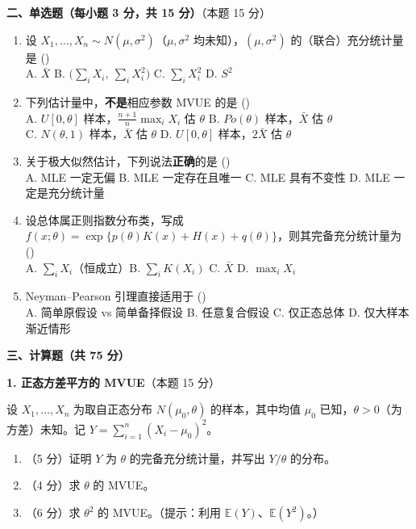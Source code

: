 \documentclass[12pt,a4paper]{ctexart}
\newcommand{\question}[2]{\bigskip\noindent\textbf{#1}\quad（本题 #2 分）\par\nobreak\medskip}
\newcommand{\E}{\mathbb{E}}
\begin{document}
\question{二、单选题（每小题 3 分，共 15 分）}{15}
\begin{enumerate}[label=\arabic*.,leftmargin=2.0em]
  \item 设 $X_1,\dots,X_n\sim N(\mu,\sigma^2)$（$\mu,\sigma^2$ 均未知），$(\mu,\sigma^2)$ 的（联合）充分统计量是 \hfill(\underline{\hspace{1.2cm}})\\
  A. $\bar X$ \quad B. $\big(\sum_i X_i,\ \sum_i X_i^2\big)$ \quad C. $\sum_i X_i^2$ \quad D. $S^2$
  \item 下列估计量中，\textbf{不是}相应参数 MVUE 的是 \hfill(\underline{\hspace{1.2cm}})\\
  A. $U[0,\theta]$ 样本，$\frac{n+1}{n}\max_i X_i$ 估 $\theta$ \quad B. $Po(\theta)$ 样本，$\bar X$ 估 $\theta$\\
  C. $N(\theta,1)$ 样本，$\bar X$ 估 $\theta$ \quad D. $U[0,\theta]$ 样本，$2\bar X$ 估 $\theta$
  \item 关于极大似然估计，下列说法\textbf{正确}的是 \hfill(\underline{\hspace{1.2cm}})\\
  A. MLE 一定无偏 \quad B. MLE 一定存在且唯一 \quad C. MLE 具有不变性 \quad D. MLE 一定是充分统计量
  \item 设总体属正则指数分布类，写成 $f(x;\theta)=\exp\{p(\theta)K(x)+H(x)+q(\theta)\}$，则其完备充分统计量为 \hfill(\underline{\hspace{1.2cm}})\\
  A. $\sum_i X_i$（恒成立）\quad B. $\sum_i K(X_i)$ \quad C. $\bar X$ \quad D. $\max_i X_i$
  \item Neyman--Pearson 引理直接适用于 \hfill(\underline{\hspace{1.2cm}})\\
  A. 简单原假设 vs 简单备择假设 \quad B. 任意复合假设 \quad C. 仅正态总体 \quad D. 仅大样本渐近情形
\end{enumerate}

\bigskip
\begin{center}\textbf{三、计算题（共 75 分）}\end{center}

\question{1. 正态方差平方的 MVUE}{15}
设 $X_1,\dots,X_n$ 为取自正态分布 $N(\mu_0,\theta)$ 的样本，其中均值 $\mu_0$ 已知，$\theta>0$（为方差）未知。记 $Y=\sum_{i=1}^n(X_i-\mu_0)^2$。
\begin{enumerate}[label=(\arabic*),leftmargin=2.2em]
  \item （5 分）证明 $Y$ 为 $\theta$ 的完备充分统计量，并写出 $Y/\theta$ 的分布。
  \item （4 分）求 $\theta$ 的 MVUE。
  \item （6 分）求 $\theta^2$ 的 MVUE。（提示：利用 $\E(Y)$、$\E(Y^2)$。）
\end{enumerate}
\end{document}
